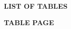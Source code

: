 \newpage
\thispagestyle{empty}

\begin{center}
\fontsize{12}{18}\bfseries\selectfont
LIST OF TABLES
\end{center}

\vspace{6pt}

\noindent\fontsize{12}{18}\bfseries\selectfont
TABLE \hfill PAGE

\vspace{6pt}

{\fontsize{12}{18}\selectfont
\makeatletter
{}
\makeatother
}